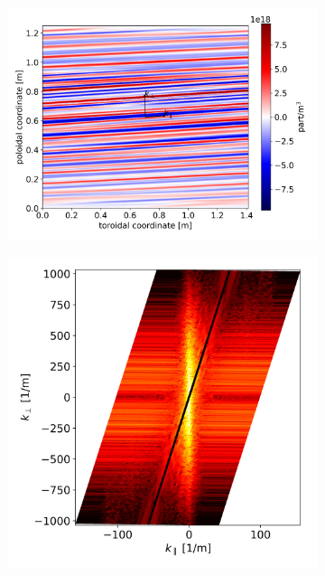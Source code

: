 \begin{figure}[H]\centering
	\begin{subfigure}[t]{0.55\textwidth}
		\centering
		\includegraphics[width=1\textwidth]{schemes/plot2Dtube_spec1_n_flutter.jpg}
		\label{fig:CIRC_fluxSurface_flutter_real}
	\end{subfigure}
	\begin{subfigure}[t]{0.4\textwidth}
		\centering
		\includegraphics[width=1\textwidth]{schemes/plotPowerSpectrum_spec1_n_flutter.jpg}

\end{subfigure}
\end{figure}
